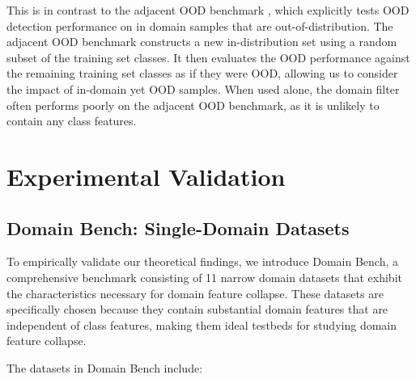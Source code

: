 \documentclass[11pt, oneside]{book}
\theoremstyle{plain}
\theoremstyle{definition}
\theoremstyle{remark}
\begin{document}
This is in contrast to the adjacent OOD benchmark \citep{yangcan}, which explicitly tests OOD detection performance on in domain samples that are out-of-distribution. The adjacent OOD benchmark constructs a new in-distribution set using a random subset of the training set classes. It then evaluates the OOD performance against the remaining training set classes as if they were OOD, allowing us to consider the impact of in-domain yet OOD samples. When used alone, the domain filter often performs poorly on the adjacent OOD benchmark, as it is unlikely to contain any class features.

\section{Experimental Validation}

\subsection{Domain Bench: Single-Domain Datasets}

To empirically validate our theoretical findings, we introduce Domain Bench, a comprehensive benchmark consisting of 11 narrow domain datasets that exhibit the characteristics necessary for domain feature collapse. These datasets are specifically chosen because they contain substantial domain features that are independent of class features, making them ideal testbeds for studying domain feature collapse.

The datasets in Domain Bench include:
\end{document}
